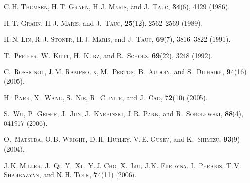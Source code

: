 \documentclass[pss]{wiley2sp} %
\begin{document}
\begin{thebibliography}{[10]}
 \textsc{C.\,H. Thomsen},  \textsc{H.\,T. Grahn},  \textsc{H.\,J. Maris},  and
  \textsc{J.~Tauc},
  \textbf{34}(6), 4129 (1986).


 \textsc{H.\,T. Grahn},  \textsc{H.\,J. Maris},  and  \textsc{J.~Tauc},
  \textbf{25}(12), 2562--2569 (1989).


 \textsc{H.\,N. Lin},  \textsc{R.\,J. Stoner},  \textsc{H.\,J. Maris},  and
  \textsc{J.~Tauc},
  \textbf{69}(7), 3816--3822 (1991).


 \textsc{T.~Pfeifer},  \textsc{W.~Kütt},  \textsc{H.~Kurz},  and
  \textsc{R.~Scholz},
  \textbf{69}(22), 3248 (1992).


 \textsc{C.~Rossignol},  \textsc{J.\,M. Rampnoux},  \textsc{M.~Perton},
  \textsc{B.~Audoin},  and  \textsc{S.~Dilhaire},
  \textbf{94}(16) (2005).


 \textsc{H.~Park},  \textsc{X.~Wang},  \textsc{S.~Nie},  \textsc{R.~Clinite},
  and  \textsc{J.~Cao},
  \textbf{72}(10) (2005).


 \textsc{S.~Wu},  \textsc{P.~Geiser},  \textsc{J.~Jun},  \textsc{J.~Karpinski},
   \textsc{J.\,R. Park},  and  \textsc{R.~Sobolewski},
  \textbf{88}(4), 041917 (2006).


 \textsc{O.~Matsuda},  \textsc{O.\,B. Wright},  \textsc{D.\,H. Hurley},
  \textsc{V.\,E. Gusev},  and  \textsc{K.~Shimizu},
  \textbf{93}(9) (2004).


 \textsc{J.\,K. Miller},  \textsc{J.~Qi},  \textsc{Y.~Xu},  \textsc{Y.\,J.
  Cho},  \textsc{X.~Liu},  \textsc{J.\,K. Furdyna},  \textsc{I.~Perakis},
  \textsc{T.\,V. Shahbazyan},  and  \textsc{N.\,H. Tolk},
  \textbf{74}(11) (2006).



\end{thebibliography}
\end{document}
